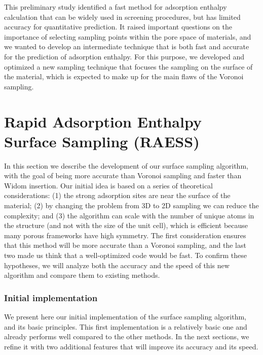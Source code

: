 \documentclass[main]{subfiles}
\begin{document}
This preliminary study identified a fast method for adsorption enthalpy calculation that can be widely used in screening procedures, but has limited accuracy for quantitative prediction. It raised important questions on the importance of selecting sampling points within the pore space of materials, and we wanted to develop an intermediate technique that is both fast and accurate for the prediction of adsorption enthalpy. For this purpose, we developed and optimized a new sampling technique that focuses the sampling on the surface of the material, which is expected to make up for the main flaws of the Voronoi sampling.



\section{Rapid Adsorption Enthalpy Surface Sampling (RAESS)}

In this section we describe the development of our surface sampling algorithm, with the goal of being more accurate than Voronoi sampling and faster than Widom insertion. Our initial idea is based on a series of theoretical considerations: (1) the strong adsorption sites are near the surface of the material; (2) by changing the problem from 3D to 2D sampling we can reduce the complexity; and (3) the algorithm can scale with the number of unique atoms in the structure (and not with the size of the unit cell), which is efficient because many porous frameworks have high symmetry. The first consideration ensures that this method will be more accurate than a Voronoi sampling, and the last two made us think that a well-optimized code would be fast. To confirm these hypotheses, we will analyze both the accuracy and the speed of this new algorithm and compare them to existing methods.

\subsubsection{Initial implementation}

We present here our initial implementation of the surface sampling algorithm, and its basic principles. This first implementation is a relatively basic one and already performs well compared to the other methods. In the next sections, we refine it with two additional features that will improve its accuracy and its speed.
\end{document}
